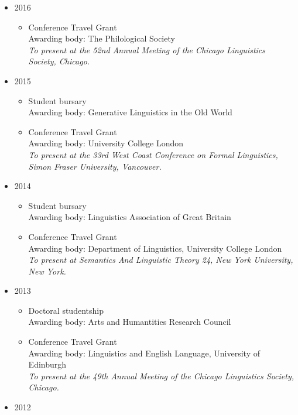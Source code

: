 \documentclass[]{article}
\providecommand{\tightlist}{%
  \setlength{\itemsep}{0pt}\setlength{\parskip}{0pt}}
\begin{document}
\begin{itemize}
\tightlist
\item
  2016

  \begin{itemize}
  \tightlist
  \item
    Conference Travel Grant\\
    Awarding body: The Philological Society\\
    \emph{To present at the 52nd Annual Meeting of the Chicago
    Linguistics Society, Chicago.}
  \end{itemize}
\item
  2015

  \begin{itemize}
  \tightlist
  \item
    Student bursary\\
    Awarding body: Generative Linguistics in the Old World
  \item
    Conference Travel Grant\\
    Awarding body: University College London\\
    \emph{To present at the 33rd West Coast Conference on Formal
    Linguistics, Simon Fraser University, Vancouver.}
  \end{itemize}
\item
  2014

  \begin{itemize}
  \tightlist
  \item
    Student bursary\\
    Awarding body: Linguistics Association of Great Britain
  \item
    Conference Travel Grant\\
    Awarding body: Department of Linguistics, University College
    London\\
    \emph{To present at Semantics And Linguistic Theory 24, New York
    University, New York.}
  \end{itemize}
\item
  2013

  \begin{itemize}
  \tightlist
  \item
    Doctoral studentship\\
    Awarding body: Arts and Humantities Research Council
  \item
    Conference Travel Grant\\
    Awarding body: Linguistics and English Language, University of
    Edinburgh\\
    \emph{To present at the 49th Annual Meeting of the Chicago
    Linguistics Society, Chicago.}
  \end{itemize}
\item
  2012


\end{itemize}
\end{document}
